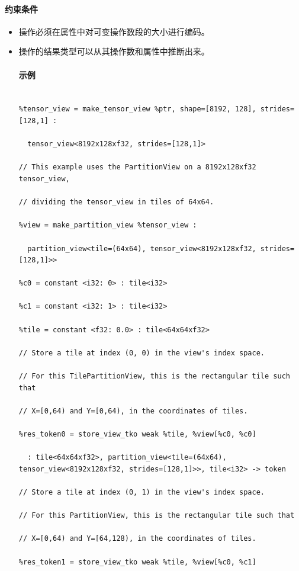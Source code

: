 \documentclass{article}
\begin{document}
\paragraph{约束条件}


\begin{itemize}
\item 操作必须在属性中对可变操作数段的大小进行编码。
\item 操作的结果类型可以从其操作数和属性中推断出来。




\paragraph{示例}


\begin{lstlisting}

%tensor_view = make_tensor_view %ptr, shape=[8192, 128], strides=[128,1] :

  tensor_view<8192x128xf32, strides=[128,1]>

// This example uses the PartitionView on a 8192x128xf32 tensor_view,

// dividing the tensor_view in tiles of 64x64.

%view = make_partition_view %tensor_view :

  partition_view<tile=(64x64), tensor_view<8192x128xf32, strides=[128,1]>>

%c0 = constant <i32: 0> : tile<i32>

%c1 = constant <i32: 1> : tile<i32>

%tile = constant <f32: 0.0> : tile<64x64xf32>

// Store a tile at index (0, 0) in the view's index space.

// For this TilePartitionView, this is the rectangular tile such that

// X=[0,64) and Y=[0,64), in the coordinates of tiles.

%res_token0 = store_view_tko weak %tile, %view[%c0, %c0]

  : tile<64x64xf32>, partition_view<tile=(64x64), tensor_view<8192x128xf32, strides=[128,1]>>, tile<i32> -> token

// Store a tile at index (0, 1) in the view's index space.

// For this PartitionView, this is the rectangular tile such that

// X=[0,64) and Y=[64,128), in the coordinates of tiles.

%res_token1 = store_view_tko weak %tile, %view[%c0, %c1]


\end{lstlisting}
\end{itemize}
\end{document}
